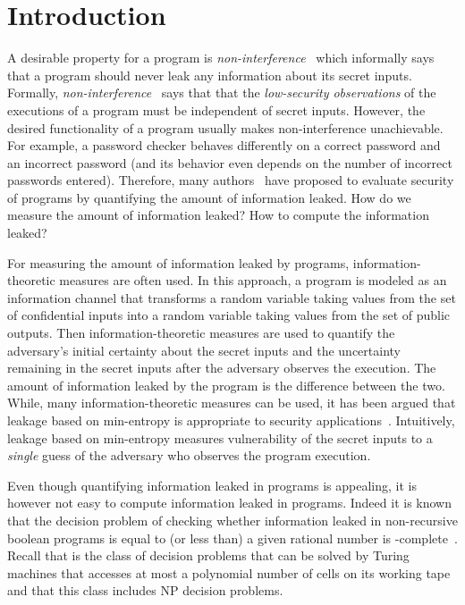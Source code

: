 

\chapter{Introduction}
	\label{CH_Intro}

A desirable property for a program is \emph{non-interference}~\cite{GougenMeseguer,Reynolds} which informally says that a program should  never leak  any information about its secret inputs. Formally, \emph{non-interference}~\cite{GougenMeseguer,Reynolds}
 says that that the \emph{low-security observations} of the executions of a program must be independent of secret inputs. However, the desired functionality of a program usually makes non-interference unachievable. For example, a password checker behaves differently on a correct password and an incorrect password   (and its behavior even depends on the number of incorrect passwords
entered).   Therefore,  many authors~\cite{Denning,Gray,Millen,Smith} have proposed to evaluate security of programs by  quantifying the amount of information leaked. How do we measure the amount of information leaked? How to compute the information leaked?


For measuring the amount of information leaked by programs, information-theoretic measures are often used. In this approach, a program is modeled as an information channel that  {transforms} a random variable taking values from the set of confidential inputs into a random variable taking values from the set of public outputs.  Then information-theoretic measures are used to quantify the adversary's initial certainty about the secret inputs and  the  uncertainty remaining in the secret inputs after the adversary observes  the execution.
 The amount of information leaked by the program is the difference between the two. While, many information-theoretic measures can be used, it has been argued that leakage based on min-entropy is appropriate to security applications~\cite{Smith}.   Intuitively, leakage based on min-entropy measures vulnerability of the secret inputs to a \emph{single} guess of the adversary who observes the program execution.
 

Even though quantifying information leaked in programs is appealing, it is however not easy to compute information leaked in programs. Indeed it is known that the decision problem of checking whether information leaked  in non-recursive boolean programs is equal to (or less than) a given rational number is  {\PSpace}-complete~\cite{Jp2,Jp3,POST,Krish}. Recall that 
 {\PSpace} is the class of decision problems that can be solved by Turing machines that accesses at most a  polynomial number of cells on its working tape and that this class includes {\textsf{NP}} decision problems. 
 
